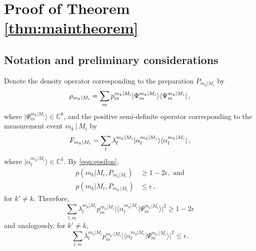 \chapter{Proof of Theorem \ref{thm:maintheorem}}
\label{sec:appendix}

\section{Notation and preliminary considerations}
Denote the density operator corresponding to the preparation $P_{m_k\vert M_i}$ by 
\begin{equation}
\label{eqn:densityop}
\rho_{m_k\vert M_i} = \sum_m p_m^{m_k\vert M_i} \vert \Psi_m^{m_k\vert M_i}\rangle\langle \Psi_m^{m_k\vert M_i} \vert\thinspace ,
\end{equation} where $\vert \Psi_m^{m_k\vert M_i} \rangle \in \mathbb{C}^k$, and the positive semi-definite operator corresponding to the measurement event $m_k\,\vert\, M_i$ by
\begin{equation}
\label{eqn:mntop}
F_{m_k\vert M_i}=\sum_l \lambda_l^{m_k\vert M_i} \vert \alpha_l^{m_k\vert M_i}\rangle \langle \alpha_l^{m_k\vert M_i} \vert\thinspace ,
\end{equation} where $\vert \alpha_l^{m_k\vert M_i} \rangle \in \mathbb{C}^k$.
By \ref{eqn:epsilon},
\begin{align*}
p(m_k\vert M_i, P_{m_k\vert M_i}) & \geq 1-2\epsilon, \text{ and} \\
p(m_k\vert M_i, P_{m_{k'}\vert M_i}) & \leq \epsilon\, ,
\end{align*}
for $k'\neq k$.
Therefore,
\begin{equation}
\label{eqn:cond1}
\sum_{l,m}\lambda_l^{m_k\vert M_i}p_m^{m_k\vert M_i}\vert \langle \alpha_l^{m_k\vert M_i} \vert \Psi_m^{m_k\vert M_i} \rangle \vert^2 \geq 1-2\epsilon
\end{equation}
and analogously, for $k'\neq k$,
\begin{equation}
\label{eqn:cond2}
\sum_{l,m}\lambda_l^{m_k\vert M_i}p_m^{m_{k'}\vert M_i}\vert \langle \alpha_l^{m_k\vert M_i} \vert \Psi_m^{m_{k'}\vert M_i} \rangle \vert^2 \leq \epsilon.
\end{equation}

